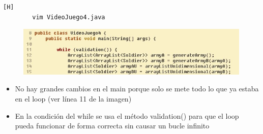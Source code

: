 \documentclass{article}
\begin{document}
	
	
	
	
	
	
	\begin{lstlisting}[language=bash,caption={Se implementa el loop While en el main para poder repetir una cantidad n de veces}][H]
		vim VideoJuego4.java
	\end{lstlisting}
	
	\begin{figure}[H]
		\centering
		\includegraphics[width=1\textwidth,keepaspectratio]{img/loop.jpg}
	\end{figure}
	
	\begin{itemize}	
		\item No hay grandes cambios en el main porque solo se mete todo lo que ya estaba en el loop (ver línea 11 de la imagen)
		\item En la condición del while se usa el método validation() para que el loop pueda funcionar de forma correcta sin causar un bucle infinito
	\end{itemize}
	
\end{document}
